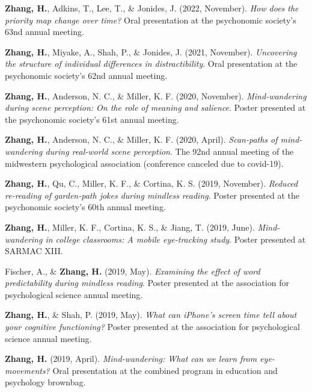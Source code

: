 \documentclass[11pt,a4paper,]{awesome-cv}
\begin{document}
\hypertarget{bibliography}{}
\leavevmode{}%
\textbf{Zhang, H.}, Adkins, T., Lee, T., \& Jonides, J. (2022,
November). \emph{How does the priority map change over time?} Oral
presentation at the psychonomic society's 63nd annual meeting.

\leavevmode{}%
\textbf{Zhang, H.}, Miyake, A., Shah, P., \& Jonides, J. (2021,
November). \emph{Uncovering the structure of individual differences in
distractibility}. Oral presentation at the psychonomic society's 62nd
annual meeting.

\leavevmode{}%
\textbf{Zhang, H.}, Anderson, N. C., \& Miller, K. F. (2020, November).
\emph{Mind-wandering during scene perception: On the role of meaning and
salience}. Poster presented at the psychonomic society's 61st annual
meeting.

\leavevmode{}%
\textbf{Zhang, H.}, Anderson, N. C., \& Miller, K. F. (2020, April).
\emph{Scan-paths of mind-wandering during real-world scene perception}.
The 92nd annual meeting of the midwestern psychological association
(conference canceled due to covid-19).

\leavevmode{}%
\textbf{Zhang, H.}, Qu, C., Miller, K. F., \& Cortina, K. S. (2019,
November). \emph{Reduced re-reading of garden-path jokes during mindless
reading}. Poster presented at the psychonomic society's 60th annual
meeting.

\leavevmode{}%
\textbf{Zhang, H.}, Miller, K. F., Cortina, K. S., \& Jiang, T. (2019,
June). \emph{Mind-wandering in college classrooms: A mobile eye-tracking
study}. Poster presented at SARMAC XIII.

\leavevmode{}%
Fischer, A., \& \textbf{Zhang, H.} (2019, May). \emph{Examining the
effect of word predictability during mindless reading}. Poster presented
at the association for psychological science annual meeting.

\leavevmode{}%
\textbf{Zhang, H.}, \& Shah, P. (2019, May). \emph{What can iPhone's
screen time tell about your cognitive functioning?} Poster presented at
the association for psychological science annual meeting.

\leavevmode{}%
\textbf{Zhang, H.} (2019, April). \emph{Mind-wandering: What can we
learn from eye-movements?} Oral presentation at the combined program in
education and psychology brownbag.
\end{document}
